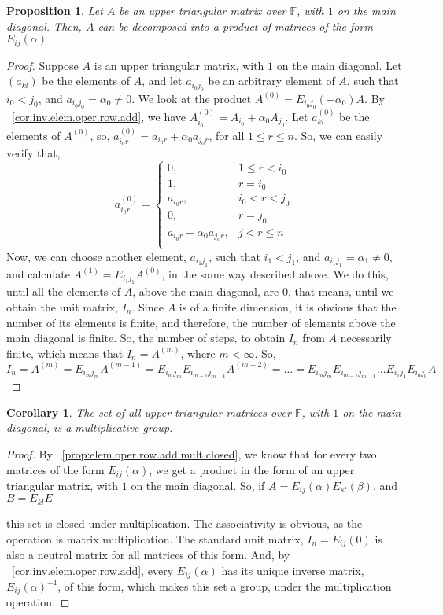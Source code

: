 \documentclass[12pt]{article}
\newtheorem{proposition}[theorem]{Proposition}
\newtheorem{corollary}[theorem]{Corollary}
\begin{document}
\begin{proposition}
Let $A$ be an upper triangular matrix over $\mathbb{F}$, with $1$ on the main diagonal. Then, $A$ can be decomposed into a product of matrices of the form $E_{ij}(\alpha)$
\end{proposition}
\begin{proof}
Suppose $A$ is an upper triangular matrix, with $1$ on the main diagonal. Let $(a_{kl})$ be the elements of $A$, and let $a_{i_0j_0}$ be an arbitrary element of $A$, such that $i_0<j_0$, and $a_{i_0j_0}=\alpha_0\neq 0$.
We look at the product $A^{(0)}=E_{i_0j_0}(-\alpha_0)A$. By ~\ref{cor:inv.elem.oper.row.add}, we have $A_{i_0}^{(0)}=A_{i_0}+\alpha_0 A_{j_0}$. Let $a_{kl}^{(0)}$ be the elements of $A^{(0)}$, so, $a_{i_0r}^{(0)}=a_{i_0r}+\alpha_0 a_{j_0r}$, for all $1\leq r\leq n$. So, we can easily verify that,
$$
a_{i_0r}^{(0)}=\begin{cases}
		0, & 1\leq r<i_0\\
            1, & r=i_0\\
            a_{i_0r}, & i_0<r<j_0\\
            0, & r=j_0\\
            a_{i_0r}-\alpha_0 a_{j_0r}, & j<r\leq n\\
		 \end{cases}
$$
Now, we can choose another element, $a_{i_1j_1}$, such that $i_1<j_1$, and $a_{i_1j_1}=\alpha_1\neq 0$, and calculate $A^{(1)}=E_{i_1j_1}A^{(0)}$, in the same way described above. We do this, until all the elements of $A$, above the main diagonal, are $0$, that means, until we obtain the unit matrix, $I_n$. Since $A$ is of a finite dimension, it is obvious that the number of its elements is finite, and therefore, the number of elements above the main diagonal is finite. So, the number of steps, to obtain $I_n$ from $A$ necessarily finite, which means that $I_n=A^{(m)}$, where $m<\infty$.
So, $I_n=A^{(m)}=E_{i_mj_m}A^{(m-1)}=E_{i_mj_m}E_{i_{m-1}j_{m-1}}A^{(m-2)}=\dots=E_{i_mj_m}E_{i_{m-1}j_{m-1}}\dots E_{i_1j_1}E_{i_0j_0}A$
\end{proof}
\begin{corollary}
The set of all upper triangular matrices over $\mathbb{F}$, with $1$ on the main diagonal, is a multiplicative group.
\end{corollary}
\begin{proof}
By ~\ref{prop:elem.oper.row.add.mult.closed}, we know that for every two matrices of the form $E_{ij}(\alpha)$, we get a product in the form of an upper triangular matrix, with $1$ on the main diagonal. So, if $A=E_{ij}(\alpha)E_{st}(\beta)$, and $B=E_{kl}E_{}$\newline

this set is closed under multiplication. The associativity is obvious, as the operation is matrix multiplication. The standard unit matrix, $I_n=E_{ij}(0)$ is also a neutral matrix for all matrices of this form. And, by ~\ref{cor:inv.elem.oper.row.add}, every $E_{ij}(\alpha)$ has its unique inverse matrix, $E_{ij}(\alpha)^{-1}$, of this form, which makes this set a group, under the multiplication operation.
\end{proof}
\end{document}
